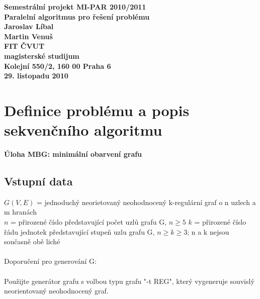 \documentclass[12pt]{article}
\begin{document}

\begin{center}
\bf Semestrální projekt MI-PAR 2010/2011\\[5mm]
    Paralelní algoritmus pro řešení problému\\[5mm]
       Jaroslav Líbal\\
       Martin Venuš\\[5mm]
FIT ČVUT\\[2mm]
magisterské studijum\\[2mm]
Kolejní 550/2, 160 00 Praha 6\\[2mm]
29. listopadu 2010
\end{center}

\newpage
\tableofcontents
\newpage

\section{Definice problému a popis sekvenčního algoritmu}
\textbf{Úloha MBG: minimální obarvení grafu}

\subsection{Vstupní data}

$G(V,E)$ = jednoduchý neorietovaný neohodnocený k-regulární graf o n uzlech a m hranách\\
$n$ = přirozené číslo představující počet uzlů grafu G, $n \geq 5$
$k$ = přirozené číslo řádu jednotek představující stupeň uzlu grafu G, $n \geq k \geq 3$; n a k nejsou současně obě liché\\
\\
Doporučení pro generování G:\\
\\
Použijte generátor grafu s volbou typu grafu "-t REG", který vygeneruje souvislý neorientovaný neohodnocený graf.
\end{document}

